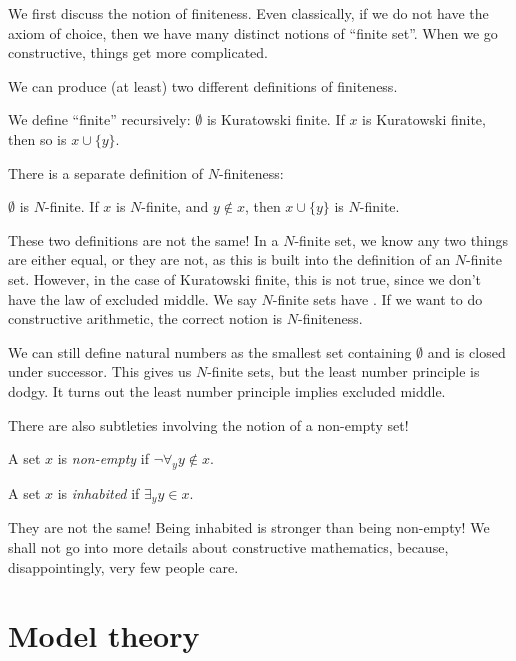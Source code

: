 \documentclass[a4paper]{article}
\begin{document}
We first discuss the notion of finiteness. Even classically, if we do not have the axiom of choice, then we have many distinct notions of ``finite set''. When we go constructive, things get more complicated.

We can produce (at least) two different definitions of finiteness.
\begin{defi}
  We define ``finite'' recursively: $\emptyset$ is Kuratowski finite. If $x$ is Kuratowski finite, then so is $x \cup \{y\}$.
\end{defi}

There is a separate definition of $N$-finiteness:
\begin{defi}[$N$-finite]
  $\emptyset$ is $N$-finite. If $x$ is $N$-finite, and $y \not \in x$, then $x \cup \{y\}$ is $N$-finite.
\end{defi}
These two definitions are not the same! In a $N$-finite set, we know any two things are either equal, or they are not, as this is built into the definition of an $N$-finite set. However, in the case of Kuratowski finite, this is not true, since we don't have the law of excluded middle. We say $N$-finite sets have .
If we want to do constructive arithmetic, the correct notion is $N$-finiteness.

We can still define natural numbers as the smallest set containing $\emptyset$ and is closed under successor. This gives us $N$-finite sets, but the least number principle is dodgy. It turns out the least number principle implies excluded middle.

There are also subtleties involving the notion of a non-empty set!
\begin{defi}
  A set $x$ is \emph{non-empty} if $\neg \forall_yy \not \in x$.
\end{defi}

\begin{defi}
  A set $x$ is \emph{inhabited} if $\exists_yy \in x$.
\end{defi}

They are not the same! Being inhabited is stronger than being non-empty! We shall not go into more details about constructive mathematics, because, disappointingly, very few people care.

\section{Model theory}
\end{document}
